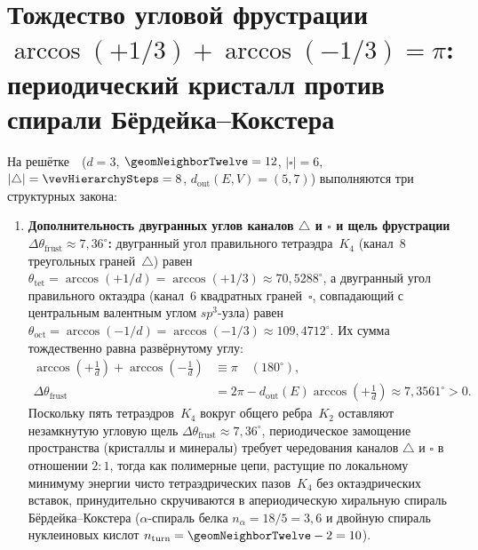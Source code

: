 \section{Тождество угловой фрустрации \texorpdfstring{$\arccos(+1/3)+\arccos(-1/3)=\pi$}{arccos(1/3)+arccos(-1/3)=pi}: периодический кристалл против спирали Бёрдейка--Кокстера}
\label{sec:bio-geometric-frustration}

\begin{theorem}
\label{thm:bio-frustration-and-three-life-types}
На решётке~\latGCKshort\ ($d=3$, $\geomNeighborTwelve=12$, $|\square|=6$, $|\triangle|=\vevHierarchySteps=8$, $d_{\mathrm{out}}(E,V)=(5,7)$) выполняются три структурных закона:
\begin{enumerate}[leftmargin=*]
\item \textbf{Дополнительность двугранных углов каналов $\triangle$ и $\square$ и щель фрустрации $\Delta\theta_{\mathrm{frust}}\approx 7{,}36^\circ$:}
  двугранный угол правильного тетраэдра~$K_4$ (канал~$8$ треугольных граней~$\triangle$) равен $\theta_{\mathrm{tet}} = \arccos(+1/d) = \arccos(+1/3) \approx 70{,}5288^\circ$, а двугранный угол правильного октаэдра (канал~$6$ квадратных граней~$\square$, совпадающий с центральным валентным углом $sp^3$-узла) равен $\theta_{\mathrm{oct}} = \arccos(-1/d) = \arccos(-1/3) \approx 109{,}4712^\circ$. Их сумма тождественно равна развёрнутому углу:
  \begin{equation}
  \label{eq:bio-tet-oct-dihedral-complement}
  \begin{aligned}
    \arccos\!\left(+\frac{1}{d}\right) + \arccos\!\left(-\frac{1}{d}\right) &\equiv \pi\quad (180^\circ),\\
    \Delta\theta_{\mathrm{frust}} &= 2\pi - d_{\mathrm{out}}(E)\arccos\!\left(+\frac{1}{d}\right) \approx 7{,}3561^\circ > 0.
  \end{aligned}
  \end{equation}
  Поскольку пять тетраэдров~$K_4$ вокруг общего ребра~$K_2$ оставляют незамкнутую угловую щель $\Delta\theta_{\mathrm{frust}} \approx 7{,}36^\circ$, периодическое замощение пространства (кристаллы и минералы) требует чередования каналов $\triangle$ и $\square$ в отношении $2:1$, тогда как полимерные цепи, растущие по локальному минимуму энергии чисто тетраэдрических пазов~$K_4$ без октаэдрических вставок, принудительно скручиваются в апериодическую хиральную спираль Бёрдейка--Кокстера ($\alpha$-спираль белка $n_\alpha = 18/5 = 3{,}6$ и двойную спираль нуклеиновых кислот $n_{\mathrm{turn}} = \geomNeighborTwelve - 2 = 10$).

\end{enumerate}
\end{theorem}
